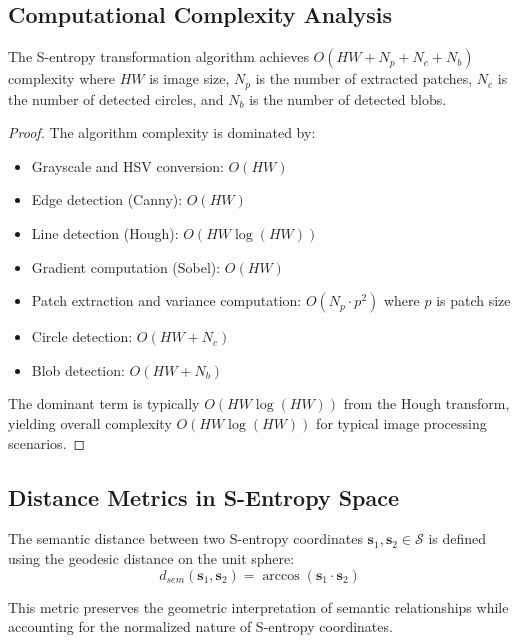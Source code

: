 \subsection{Computational Complexity Analysis}

\begin{theorem}
The S-entropy transformation algorithm achieves $O(HW + N_p + N_c + N_b)$ complexity where $HW$ is image size, $N_p$ is the number of extracted patches, $N_c$ is the number of detected circles, and $N_b$ is the number of detected blobs.
\end{theorem}

\begin{proof}
The algorithm complexity is dominated by:
\begin{itemize}
\item Grayscale and HSV conversion: $O(HW)$
\item Edge detection (Canny): $O(HW)$
\item Line detection (Hough): $O(HW \log(HW))$
\item Gradient computation (Sobel): $O(HW)$
\item Patch extraction and variance computation: $O(N_p \cdot p^2)$ where $p$ is patch size
\item Circle detection: $O(HW + N_c)$
\item Blob detection: $O(HW + N_b)$
\end{itemize}
The dominant term is typically $O(HW \log(HW))$ from the Hough transform, yielding overall complexity $O(HW \log(HW))$ for typical image processing scenarios.
\end{proof}

\subsection{Distance Metrics in S-Entropy Space}

\begin{definition}
The semantic distance between two S-entropy coordinates $\mathbf{s}_1, \mathbf{s}_2 \in \mathcal{S}$ is defined using the geodesic distance on the unit sphere:
\begin{equation}
d_{sem}(\mathbf{s}_1, \mathbf{s}_2) = \arccos(\mathbf{s}_1 \cdot \mathbf{s}_2)
\label{eq:semantic-distance}
\end{equation}
\end{definition}

This metric preserves the geometric interpretation of semantic relationships while accounting for the normalized nature of S-entropy coordinates.


